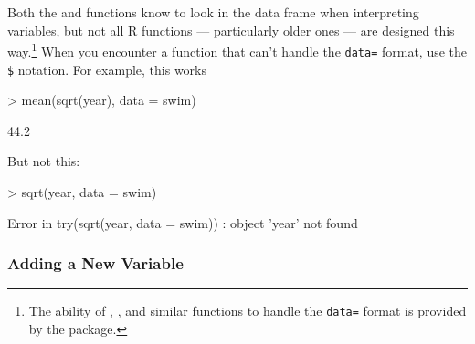 Both the  and  functions know to look in
the data frame when interpreting variables, but not all R functions
--- particularly older ones --- are designed this way.\footnote{The
  ability of , , and similar
  functions to handle the \texttt{data=} format is provided by the
   package.}  When you encounter a function that can't
handle the \texttt{data=} format, use the \texttt{\$} notation. 
For example, this works
\begin{Schunk}
\begin{Sinput}
> mean(sqrt(year), data = swim)
\end{Sinput}
\begin{Soutput}
[1] 44.2
\end{Soutput}
\end{Schunk}
But not this:
\begin{Schunk}
\begin{Sinput}
> sqrt(year, data = swim)
\end{Sinput}
\end{Schunk}
\begin{Schunk}
\begin{Soutput}
Error in try(sqrt(year, data = swim)) : object 'year' not found
\end{Soutput}
\end{Schunk}




\subsubsection{Adding a New Variable}


